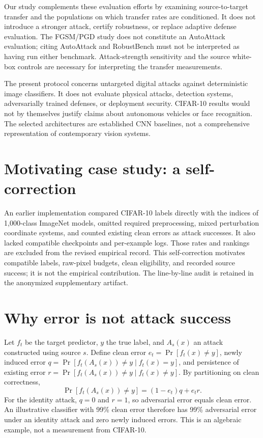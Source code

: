 \documentclass[10pt]{article}
\begin{document}
Our study complements these evaluation efforts by examining source-to-target transfer and the populations on which transfer rates are conditioned. It does not introduce a stronger attack, certify robustness, or replace adaptive defense evaluation. The FGSM/PGD study does not constitute an AutoAttack evaluation; citing AutoAttack and RobustBench must not be interpreted as having run either benchmark. Attack-strength sensitivity and the source white-box controls are necessary for interpreting the transfer measurements.

The present protocol concerns untargeted digital attacks against deterministic image classifiers. It does not evaluate physical attacks, detection systems, adversarially trained defenses, or deployment security. CIFAR-10 results would not by themselves justify claims about autonomous vehicles or face recognition. The selected architectures are established CNN baselines, not a comprehensive representation of contemporary vision systems.

\section{Motivating case study: a self-correction}
An earlier implementation compared CIFAR-10 labels directly with the indices of 1,000-class ImageNet models, omitted required preprocessing, mixed perturbation coordinate systems, and counted existing clean errors as attack successes. It also lacked compatible checkpoints and per-example logs. Those rates and rankings are excluded from the revised empirical record. This self-correction motivates compatible labels, raw-pixel budgets, clean eligibility, and recorded source success; it is not the empirical contribution. The line-by-line audit is retained in the anonymized supplementary artifact.

\section{Why error is not attack success}
Let $f_t$ be the target predictor, $y$ the true label, and $A_s(x)$ an attack constructed using source $s$. Define clean error $e_t=\Pr[f_t(x)\ne y]$, newly induced error $q=\Pr[f_t(A_s(x))\ne y\mid f_t(x)=y]$, and persistence of existing error $r=\Pr[f_t(A_s(x))\ne y\mid f_t(x)\ne y]$. By partitioning on clean correctness,
\begin{equation}
\Pr[f_t(A_s(x))\ne y]=(1-e_t)q+e_t r.
\end{equation}
For the identity attack, $q=0$ and $r=1$, so adversarial error equals clean error. An illustrative classifier with 99\% clean error therefore has 99\% adversarial error under an identity attack and zero newly induced errors. This is an algebraic example, not a measurement from CIFAR-10.
\end{document}
